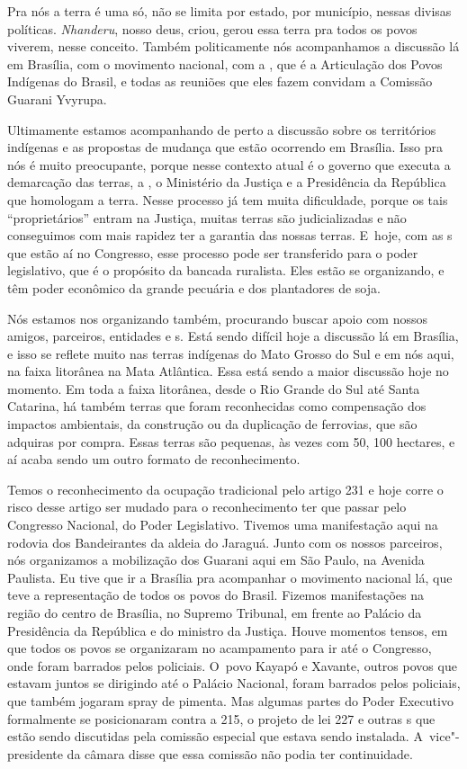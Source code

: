 Pra nós a terra é uma só, não se limita por estado, por município,
nessas divisas políticas. \emph{Nhanderu}, nosso deus, criou, gerou essa terra
pra todos os povos viverem, nesse conceito. Também politicamente nós
acompanhamos a discussão lá em Brasília, com o movimento nacional, com
a , que é a Articulação dos Povos Indígenas do Brasil, e todas as
reuniões que eles fazem convidam a Comissão Guarani Yvyrupa.

Ultimamente estamos acompanhando de perto a discussão sobre os
territórios indígenas e as propostas de mudança que estão ocorrendo em
Brasília. Isso pra nós é muito preocupante, porque nesse contexto atual
é o governo que executa a demarcação das terras, a , o Ministério
da Justiça e a Presidência da República que homologam a terra. Nesse
processo já tem muita dificuldade, porque os tais ``proprietários''
entram na Justiça, muitas terras são judicializadas e não conseguimos
com mais rapidez ter a garantia das nossas terras. E~hoje, com as s
que estão aí no Congresso, esse processo pode ser transferido para o
poder legislativo, que é o propósito da bancada ruralista. Eles estão
se organizando, e têm poder econômico da grande pecuária e dos
plantadores de soja. 

Nós estamos nos organizando também, procurando buscar apoio com nossos
amigos, parceiros, entidades e s. Está sendo difícil hoje a
discussão lá em Brasília, e isso se reflete muito nas terras indígenas
do Mato Grosso do Sul e em nós aqui, na faixa litorânea na Mata Atlântica.
Essa está sendo a maior discussão hoje no momento. Em toda a faixa
litorânea, desde o Rio Grande do Sul até Santa Catarina, há também
terras que foram reconhecidas como compensação dos impactos ambientais,
da construção ou da duplicação de ferrovias, que são adquiras por
compra. Essas terras são pequenas, às vezes com 50, 100 hectares, e aí
acaba sendo um outro formato de reconhecimento.

Temos o reconhecimento da ocupação tradicional pelo artigo 231 e hoje
corre o risco desse artigo ser mudado para o reconhecimento ter que
passar pelo Congresso Nacional, do Poder Legislativo. Tivemos uma
manifestação aqui na rodovia dos Bandeirantes da aldeia do Jaraguá.
Junto com os nossos parceiros, nós organizamos a mobilização dos
Guarani aqui em São Paulo, na Avenida Paulista. Eu tive que ir a
Brasília pra acompanhar o movimento nacional lá, que teve a
representação de todos os povos do Brasil. Fizemos manifestações na
região do centro de Brasília, no Supremo Tribunal, em frente ao Palácio
da Presidência da República e do ministro da Justiça. Houve momentos
tensos, em que todos os povos se organizaram no acampamento para ir até
o Congresso, onde foram barrados pelos policiais. O~povo Kayapó e
Xavante, outros povos que estavam juntos se dirigindo até o Palácio
Nacional, foram barrados pelos policiais, que também jogaram spray de
pimenta. Mas algumas partes do Poder Executivo formalmente se
posicionaram contra a  215, o projeto de lei 227 e outras s que
estão sendo discutidas pela comissão especial que estava sendo
instalada. A~vice"-presidente da câmara disse que essa comissão não
podia ter continuidade.


